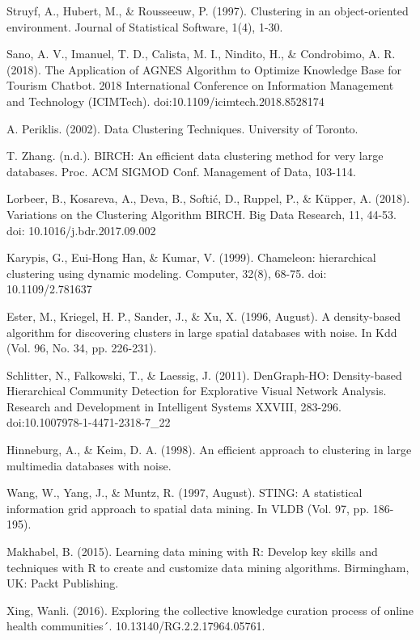 \documentclass[10pt, a4paper]{article}
\begin{document}
\begin{thebibliography}{X}
 Struyf, A., Hubert, M., \& Rousseeuw, P. (1997). Clustering in an object-oriented environment. Journal of Statistical Software, 1(4), 1-30.

 Sano, A. V., Imanuel, T. D., Calista, M. I., Nindito, H., \& Condrobimo, A. R. (2018). The Application of AGNES Algorithm to Optimize Knowledge Base for Tourism Chatbot. 2018 International Conference on Information Management and Technology (ICIMTech). doi:10.1109/icimtech.2018.8528174

 A. Periklis. (2002). Data Clustering Techniques. University of Toronto.

 T. Zhang. (n.d.). BIRCH: An efficient data clustering method for very large databases. Proc. ACM SIGMOD Conf. Management of Data, 103-114.

 Lorbeer, B., Kosareva, A., Deva, B., Softić, D., Ruppel, P., \& Küpper, A. (2018). Variations on the Clustering Algorithm BIRCH. Big Data Research, 11, 44-53. doi: 10.1016/j.bdr.2017.09.002

 Karypis, G., Eui-Hong Han, \& Kumar, V. (1999). Chameleon: hierarchical clustering using dynamic modeling. Computer, 32(8), 68-75. doi: 10.1109/2.781637

 Ester, M., Kriegel, H. P., Sander, J., \& Xu, X. (1996, August). A density-based algorithm for discovering clusters in large spatial databases with noise. In Kdd (Vol. 96, No. 34, pp. 226-231).

 Schlitter, N., Falkowski, T., \& Laessig, J. (2011). DenGraph-HO: Density-based Hierarchical Community Detection for Explorative Visual Network Analysis. Research and Development in Intelligent Systems XXVIII, 283-296. doi:10.1007\/978-1-4471-2318-7\_22

 Hinneburg, A., \& Keim, D. A. (1998). An efficient approach to clustering in large multimedia databases with noise.

 Wang, W., Yang, J., \& Muntz, R. (1997, August). STING: A statistical information grid approach to spatial data mining. In VLDB (Vol. 97, pp. 186-195).

 Makhabel, B. (2015). Learning data mining with R: Develop key skills and techniques with R to create and customize data mining algorithms. Birmingham, UK: Packt Publishing.

 Xing, Wanli. (2016). Exploring the collective knowledge curation process of online health communities´. 10.13140/RG.2.2.17964.05761. 


\end{thebibliography}
\end{document}
